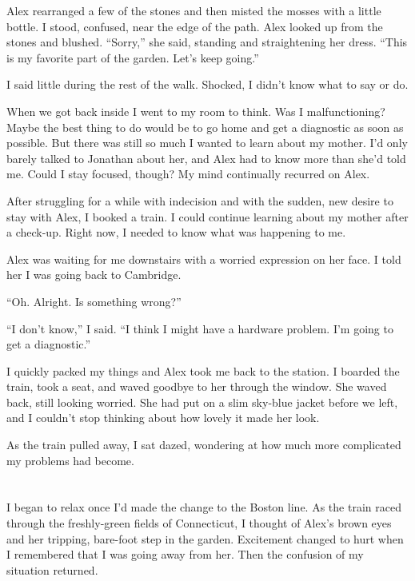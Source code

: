\documentclass[10pt,b5paper]{article}
\begin{document}
Alex rearranged a few of the stones and then misted the mosses
with a little bottle. I stood, confused, near the edge of the path.
Alex looked up from the stones and blushed.  ``Sorry,'' she said,
standing and straightening her dress.  ``This is my favorite part of
the garden. Let's keep going.''

I said little during the rest of the walk.  Shocked, I didn't know
what to say or do.

\bigskip

When we got back inside I went to my room to think. Was I
malfunctioning? Maybe the best thing to do would be to go home and
get a diagnostic as soon as possible. But there was still so much I
wanted to learn about my mother. I'd only barely talked to Jonathan
about her, and Alex had to know more than she'd told me. Could I stay
focused, though? My mind continually recurred on Alex.

After struggling for a while with indecision and with the sudden,
new desire to stay with Alex, I booked a train. I could continue
learning about my mother after a check-up. Right now, I needed to
know what was happening to me.

Alex was waiting for me downstairs with a worried expression on her
face. I told her I was going back to Cambridge.

``Oh. Alright. Is something wrong?''

``I don't know,'' I said. ``I think I might have a hardware
problem. I'm going to get a diagnostic.''

I quickly packed my things and Alex took me back to the station.
I boarded the train, took a seat, and waved goodbye to her through
the window.  She waved back, still looking worried.  She had put on
a slim sky-blue jacket before we left, and I couldn't stop thinking
about how lovely it made her look.

As the train pulled away, I sat dazed, wondering at how much more
complicated my problems had become.

\section{}

I began to relax once I'd made the change to the Boston line.
As the train raced through the freshly-green fields of Connecticut,
I thought of Alex's brown eyes and her tripping, bare-foot step in
the garden. Excitement changed to hurt when I remembered that I was
going away from her. Then the confusion of my situation returned.
\end{document}
